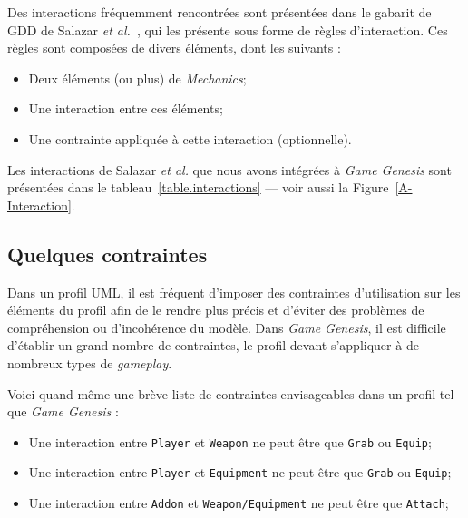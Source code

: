 Des interactions fréquemment rencontrées sont présentées dans le gabarit de GDD de Salazar \emph{et al.}~\cite{salazar_gdd}, qui les présente sous forme de règles d'interaction.
Ces règles sont composées de divers éléments, dont les suivants :
\begin{itemize}
    \item Deux \'el\'ements (ou plus) de \emph{Mechanics};
    \item Une interaction entre ces \'el\'ements;
    \item Une contrainte appliquée à cette interaction (optionnelle).
\end{itemize}
Les interactions de Salazar \emph{et al.} que nous avons intégrées à \emph{Game Genesis} sont présentées dans le tableau~\ref{table.interactions} --- voir aussi la Figure~\ref{A-Interaction}.




\subsection{Quelques contraintes}

Dans un profil UML, il est fréquent d'imposer des contraintes d'utilisation sur les \'el\'ements du profil afin de le rendre plus précis et d'éviter des problèmes de compréhension ou d'incohérence du modèle.
Dans \emph{Game Genesis}, il est difficile d'établir un grand nombre de contraintes, le profil devant s'appliquer à de nombreux types de \emph{gameplay}.

Voici quand m\^eme une br\`eve liste de contraintes envisageables dans un profil tel que \emph{Game Genesis} :
\begin{itemize}
    \item Une interaction entre \texttt{Player} et \texttt{Weapon} ne peut être que \texttt{Grab} ou \texttt{Equip};
    \item Une interaction entre \texttt{Player} et \texttt{Equipment} ne peut être que \texttt{Grab} ou \texttt{Equip};
    \item Une interaction entre \texttt{Addon} et \texttt{Weapon/Equipment} ne peut être que \texttt{Attach};
\end{itemize}

